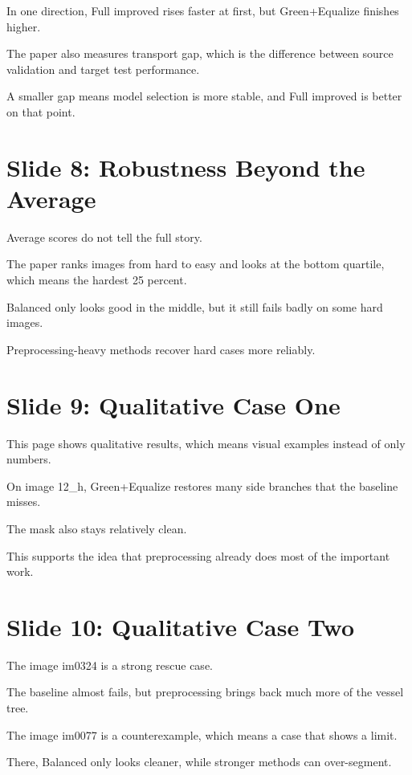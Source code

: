 \documentclass[12pt,a4paper]{article}
\begin{document}
In one direction, Full improved rises faster at first, but Green+Equalize finishes higher.

The paper also measures transport gap, which is the difference between source validation and target test performance.

A smaller gap means model selection is more stable, and Full improved is better on that point.

\newpage

\section*{Slide 8: Robustness Beyond the Average}

Average scores do not tell the full story.

The paper ranks images from hard to easy and looks at the bottom quartile, which means the hardest 25 percent.

Balanced only looks good in the middle, but it still fails badly on some hard images.

Preprocessing-heavy methods recover hard cases more reliably.

\newpage

\section*{Slide 9: Qualitative Case One}

This page shows qualitative results, which means visual examples instead of only numbers.

On image 12\_h, Green+Equalize restores many side branches that the baseline misses.

The mask also stays relatively clean.

This supports the idea that preprocessing already does most of the important work.

\newpage

\section*{Slide 10: Qualitative Case Two}

The image im0324 is a strong rescue case.

The baseline almost fails, but preprocessing brings back much more of the vessel tree.

The image im0077 is a counterexample, which means a case that shows a limit.

There, Balanced only looks cleaner, while stronger methods can over-segment.
\end{document}
